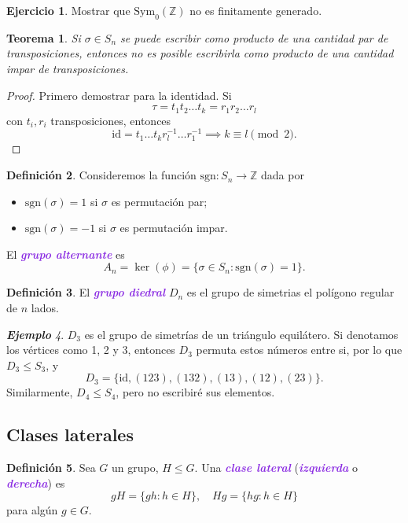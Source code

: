 \documentclass{article}
\newtheorem{theorem}{Teorema}[subsection]
\theoremstyle{definition}
\newtheorem{definition}[theorem]{Definición}
\newtheorem{exercise}{Ejercicio}
\theoremstyle{remark}
\newtheorem{example}[theorem]{\textbf{Ejemplo}}
\numberwithin{equation}{section}
\newcommand{\Z}{\mathbb{Z}}
\newcommand{\sgn}{\mathrm{sgn}}
\newcommand{\id}{\mathrm{id}}
\newcommand{\Sym}{\mathrm{Sym}}
\newcommand{\wea}[1]{\textcolor{BlueViolet}{\textbf{\emph{#1}}}}
\begin{document}
\begin{exercise}
  Mostrar que $\Sym_0(\Z)$ no es finitamente generado.
\end{exercise}

\begin{theorem}
  Si $\sigma \in S_n$ se puede escribir como producto de una cantidad par de transposiciones, entonces no es posible escribirla como producto de una cantidad impar de transposiciones.
\end{theorem}
\begin{proof}
  Primero demostrar para la identidad. %
  Si
  \[\tau = t_1 t_2 \dots t_k = r_1 r_2 \dots r_l\]
  con $t_i, r_i$ transposiciones, entonces
  \[\id = t_1 \dots t_k r_l^{-1} \dots r_1^{-1}
  \implies k \equiv l \pmod 2.\]
\end{proof}

\begin{definition}
  Consideremos la función $\sgn \colon S_n \to \Z$ dada por
  \begin{itemize}
    \item $\sgn(\sigma) = 1$ si $\sigma$ es permutación par;
    \item $\sgn(\sigma) = -1$ si $\sigma$ es permutación impar.
  \end{itemize}
  El \wea{grupo alternante} es
  \[A_n = \ker(\phi) = \{\sigma \in S_n : \sgn(\sigma) = 1\}.\]
\end{definition}

\begin{definition}
  El \wea{grupo diedral} $D_n$ es el grupo de simetrias el polígono regular de $n$ lados.
\end{definition}

\begin{example}
  $D_3$ es el grupo de simetrías de un triángulo equilátero. Si denotamos los vértices como 1, 2 y 3, entonces $D_3$ permuta estos números entre si, por lo que $D_3 \leqslant S_3$, y
  \[D_3 = \{\id, (123), (132), (13), (12), (23)\}.\]
  Similarmente, $D_4 \leqslant S_4$, pero no escribiré sus elementos.
\end{example}

\newpage
\subsection{Clases laterales}

\begin{definition}
  Sea $G$ un grupo, $H \leqslant G$. Una \wea{clase lateral} (\wea{izquierda} o \wea{derecha}) es
  \[gH = \{gh : h \in H\}, \quad Hg = \{hg : h \in H\}\]
  para algún $g \in G$.
\end{definition}
\end{document}
